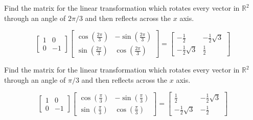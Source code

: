 \documentclass{ximera}
\begin{document}
\begin{problem}\label{prb:6.16} Find the matrix for the linear transformation which rotates every
vector in $\mathbb{R}^{2}$ through an angle of $2\pi /3$ and then reflects
across the $x$ axis.
\begin{hint}
\[
\left[
\begin{array}{rr}
1 & 0 \\
0 & -1
\end{array}
\right] \left[
\begin{array}{cc}
\cos \left( \frac{2\pi }{3}\right)  & -\sin \left( \frac{2\pi }{3}\right)
\\
\sin \left( \frac{2\pi }{3}\right)  & \cos \left( \frac{2\pi }{3}\right)
\end{array}
\right] = \left[
\begin{array}{cc}
-\frac{1}{2} & -\frac{1}{2}\sqrt{3} \\
-\frac{1}{2}\sqrt{3} & \frac{1}{2}
\end{array}
\right]
\]
\end{hint}
\end{problem}

\begin{problem}\label{prb:6.17} Find the matrix for the linear transformation which rotates every
vector in $\mathbb{R}^{2}$ through an angle of $\pi /3$ and then reflects
across the $x$ axis.
\begin{hint}
\[
\left[
\begin{array}{rr}
1 & 0 \\
0 & -1
\end{array}
\right] \left[
\begin{array}{cc}
\cos \left( \frac{\pi }{3}\right)  & -\sin \left( \frac{\pi }{3}\right)  \\
\sin \left( \frac{\pi }{3}\right)  & \cos \left( \frac{\pi }{3}\right)
\end{array}
\right] = \left[
\begin{array}{cc}
\frac{1}{2} & -\frac{1}{2}\sqrt{3} \\
-\frac{1}{2}\sqrt{3} & -\frac{1}{2}
\end{array}
\right]
\]
\end{hint}
\end{problem}
\end{document}
